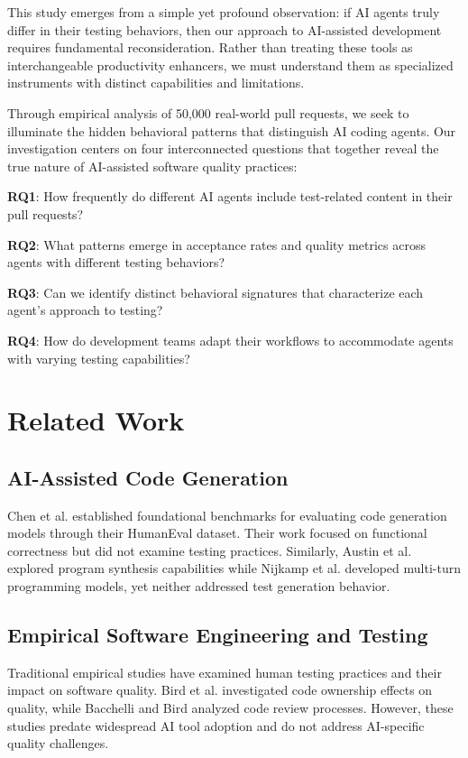 \documentclass[conference]{IEEEtran}
\begin{document}
This study emerges from a simple yet profound observation: if AI agents truly differ in their testing behaviors, then our approach to AI-assisted development requires fundamental reconsideration. Rather than treating these tools as interchangeable productivity enhancers, we must understand them as specialized instruments with distinct capabilities and limitations.

Through empirical analysis of 50,000 real-world pull requests, we seek to illuminate the hidden behavioral patterns that distinguish AI coding agents. Our investigation centers on four interconnected questions that together reveal the true nature of AI-assisted software quality practices:

\textbf{RQ1}: How frequently do different AI agents include test-related content in their pull requests?

\textbf{RQ2}: What patterns emerge in acceptance rates and quality metrics across agents with different testing behaviors?

\textbf{RQ3}: Can we identify distinct behavioral signatures that characterize each agent's approach to testing?

\textbf{RQ4}: How do development teams adapt their workflows to accommodate agents with varying testing capabilities?

\section{Related Work}

\subsection{AI-Assisted Code Generation}

Chen et al. \cite{chen2021evaluating} established foundational benchmarks for evaluating code generation models through their HumanEval dataset. Their work focused on functional correctness but did not examine testing practices. Similarly, Austin et al. \cite{austin2021program} explored program synthesis capabilities while Nijkamp et al. \cite{nijkamp2023codegen} developed multi-turn programming models, yet neither addressed test generation behavior.

\subsection{Empirical Software Engineering and Testing}

Traditional empirical studies have examined human testing practices and their impact on software quality. Bird et al. \cite{bird2011dont} investigated code ownership effects on quality, while Bacchelli and Bird \cite{bacchelli2013expectations} analyzed code review processes. However, these studies predate widespread AI tool adoption and do not address AI-specific quality challenges.
\end{document}
